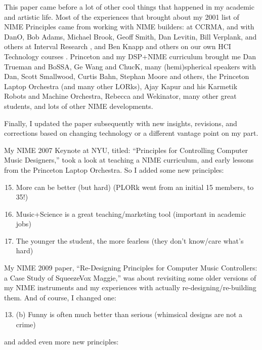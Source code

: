 This paper came before a lot of other cool things that happened in my academic and artistic life.  Most of the experiences that brought about my 2001 list of NIME Principles came from working with NIME builders: at CCRMA, and with DanO, Bob Adams, Michael Brook, Geoff Smith, Dan Levitin, Bill Verplank, and others at Interval Research \cite{Levitin:2002}, and Ben Knapp and others on our own HCI Technology courses \cite{Knapp:1995}.  Princeton and my DSP+NIME curriculum brought me Dan Trueman and BoSSA, Ge Wang and ChucK, many (hemi)spherical speakers with Dan, Scott Smallwood, Curtis Bahn, Stephan Moore and others, the Princeton Laptop Orchestra (and many other LORks), Ajay Kapur and his Karmetik Robots and Machine Orchestra, Rebecca and Wekinator, many other great students, and lots of other NIME developments.

Finally, I updated the paper subsequently with new insights, revisions, and corrections based on changing technology or a different vantage point on my part.

My NIME 2007 Keynote at NYU, titled: ``Principles for Controlling Computer Music Designers,'' \cite{Cook:2007} took a look at teaching a NIME curriculum, and early lessons from the Princeton Laptop Orchestra.  So I added some new principles:  

\begin{enumerate}
 \setcounter{enumi}{14}
	\item More can be better (but hard) (PLORk went from an initial 15 members,  to 35!)
	\item Music+Science is a great teaching/marketing tool (important in academic jobs)
	\item The younger the student, the more fearless (they don't know/care what's hard)
\end{enumerate}

My NIME 2009 paper, ``Re-Designing Principles for Computer Music Controllers: a Case Study of SqueezeVox Maggie,'' \cite{Cook:2009} was about revisiting some older versions of my NIME instruments and my experiences with actually re-designing/re-building them.  And of course, I changed one: 

\begin{enumerate}
 \setcounter{enumi}{12}
	\item (b) Funny is often much better than serious (whimsical designs are not a crime)
\end{enumerate}

\noindent
and added even more new principles:

